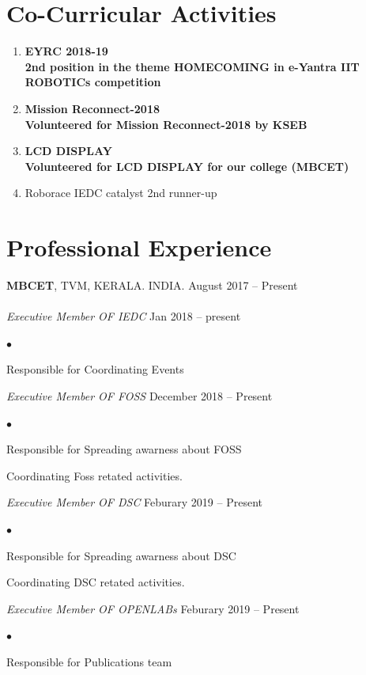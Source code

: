 \documentclass[margin,line]{res}
\newenvironment{list2}{
	\begin{list}{$\bullet$}{%
			\setlength{\itemsep}{0in}
			\setlength{\parsep}{0in} \setlength{\parskip}{0in}
			\setlength{\topsep}{0in} \setlength{\partopsep}{0in}
			\setlength{\leftmargin}{0.2in}}}{\end{list}}
\begin{document}
\begin{resume}
\section{\sc Co-Curricular Activities}
\begin{enumerate} %
	\item \bf EYRC 2018-19 \\
	2nd position in the theme HOMECOMING in e-Yantra IIT ROBOTICs competition \\
	\item \bf Mission Reconnect-2018\\
	Volunteered for Mission Reconnect-2018 by KSEB 
	\item \bf LCD DISPLAY   \\
	Volunteered for LCD DISPLAY for our college (MBCET)
	\item Roborace IEDC catalyst 2nd runner-up\\
	
\end{enumerate}
\section{\sc Professional Experience}
{\bf MBCET}, TVM, KERALA. INDIA. \hfill{August 2017 -- Present}\\
\\
{\em Executive Member  OF IEDC }\hfill {Jan 2018 -- present}\\
\begin{list2} %
	\item Responsible for Coordinating Events  \\
\end{list2}
{\em Executive Member  OF FOSS }\hfill {December 2018 -- Present}\\
\begin{list2} %
	\item Responsible for Spreading awarness about FOSS  \\
	\item Coordinating Foss retated activities.
\end{list2}

{\em Executive Member  OF DSC }\hfill {Feburary 2019 -- Present}\\
\begin{list2} %
	\item Responsible for Spreading awarness about DSC  \\
	\item Coordinating DSC retated activities.
\end{list2}
{\em Executive Member  OF OPENLABs }\hfill {Feburary 2019 -- Present}\\
\begin{list2} %
	\item Responsible for Publications team  \\
	

\end{list2}
\end{resume}
\end{document}
